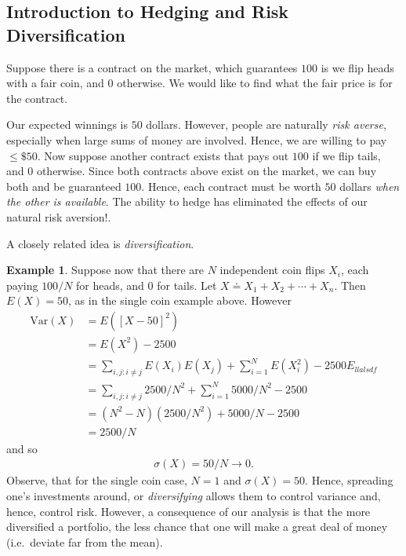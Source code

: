 \documentclass[12pt]{article}
\theoremstyle{plain}
\theoremstyle{definition}
\newtheorem*{example}{Example}
\theoremstyle{remark}
\numberwithin{equation}{section}  %
\begin{document}
\subsection{Introduction to Hedging and Risk Diversification}
Suppose there is a contract on the market, which guarantees $100$ is we flip heads with a fair coin, and $0$ otherwise. We would like to find what the fair price is for the contract. 

Our expected winnings is $50$ dollars. However, people are naturally \emph{risk averse}, especially when large sums of money are involved. Hence, we are willing to pay $\le \$50$. Now suppose another contract exists that pays out $100$ if we flip tails, and $0$ otherwise. Since both contracts above exist on the market, we can buy both and be guaranteed $100$. Hence, each contract must be worth $50$ dollars \emph{when the other is available}.  The ability to hedge has eliminated the effects of our natural risk aversion!. 

A closely related idea is \emph{diversification}. 
\begin{example}
    Suppose now that there are $N$ independent coin flips $X_i$, each paying $100/N$ for heads, and $0$ for tails. Let $X \doteq X_1 + X_2 + \cdots + X_n$. Then $E(X) = 50$, as in the single coin example above. However
    \begin{align*}
        \text{Var}(X)
        & = E({[X - 50]}^2)
        \\
        & = E(X^2) - 2500
        \\
        & = \sum_{i,j: i \neq j} E(X_i)E(X_j) + \sum_{i=1}^N E(X_i^2) - 2500 E_{llalsdf}
        \\
        & = \sum_{i,j: i \neq j} 2500/N^2 + \sum_{i=1}^{N} 5000/N^2 - 2500
        \\
        & = (N^{2} - N)(2500/N^2) + 5000/N - 2500
        \\
        & = 2500/N 
    \end{align*}
    and so
    \begin{align*}
        \sigma(X) = 50/N \to 0.
    \end{align*}
    Observe, that for the single coin case, $N = 1$ and $\sigma(X) = 50$.
    Hence, spreading one's investments around, or \emph{diversifying} allows them to
    control variance and, hence, control risk. However, a consequence of our analysis is that the more diversified a portfolio, the less chance that one will make a great deal of money (i.e.\ deviate far from the mean).  
\end{example}
\end{document}
